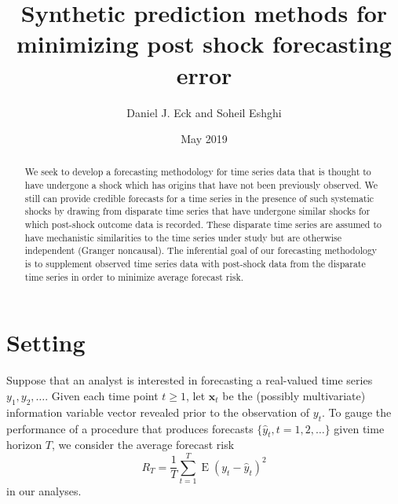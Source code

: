 \documentclass[11pt]{article}
\title{Synthetic prediction methods for minimizing post shock forecasting error}
\author{Daniel J. Eck and Soheil Eshghi}
\date{May 2019}
\newcommand{\x}{\textbf{x}}
\DeclareMathOperator{\E}{E}
\begin{document}
\maketitle
\begin{abstract}
    We seek to develop a forecasting methodology for time series data that is 
    thought to have undergone a shock which has origins that have not been 
    previously observed.  We still can provide credible forecasts for a time 
    series in the presence of such systematic shocks by drawing from disparate 
    time series that have undergone similar shocks for which post-shock 
    outcome data is recorded.  These disparate time series are assumed to have 
    mechanistic similarities to the time series under study but are otherwise 
    independent (Granger noncausal).  The inferential goal of our forecasting 
    methodology is to supplement observed time series data with post-shock 
    data from the disparate time series in order to minimize average forecast 
    risk. 
\end{abstract}


\section{Setting}
Suppose that an analyst is interested in forecasting a real-valued time series 
$y_1, y_2, \ldots$.  Given each time point $t \geq 1$, let $\x_t$ be the 
(possibly multivariate) information variable vector revealed prior to the 
observation of $y_t$.  To gauge the performance of a procedure that produces forecasts 
$\{\hat y_t, t= 1,2,\ldots\}$ given time horizon $T$, we consider the average 
forecast risk
$$
  R_T = \frac{1}{T}\sum_{t=1}^T\E(y_t - \hat y_t)^2
$$
in our analyses.
\end{document}
